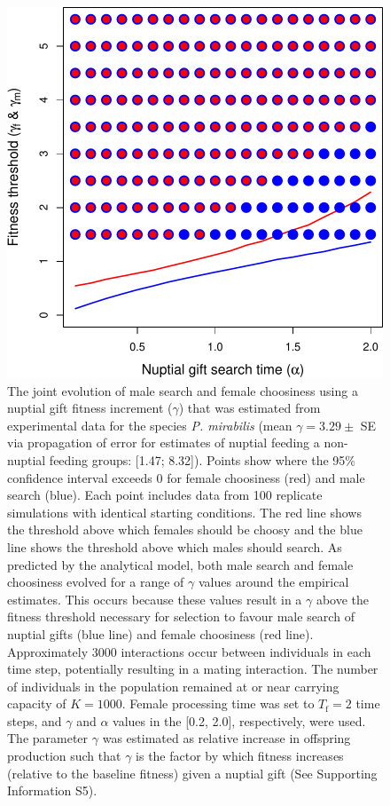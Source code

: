 \documentclass[
]{article}
\begin{document}
\begin{figure}
\centering
\includegraphics{ms_refs_fixed_files/figure-latex/unnamed-chunk-5-1.pdf}
\caption{The joint evolution of male search and female choosiness using
a nuptial gift fitness increment (\(\gamma\)) that was estimated from
experimental data for the species \emph{P. mirabilis} (mean
\(\gamma = 3.29 \pm\) SE via propagation of error for estimates of
nuptial feeding a non-nuptial feeding groups: {[}1.47; 8.32{]}). Points
show where the 95\% confidence interval exceeds 0 for female choosiness
(red) and male search (blue). Each point includes data from 100
replicate simulations with identical starting conditions. The red line
shows the threshold above which females should be choosy and the blue
line shows the threshold above which males should search. As predicted
by the analytical model, both male search and female choosiness evolved
for a range of \(\gamma\) values around the empirical estimates. This
occurs because these values result in a \(\gamma\) above the fitness
threshold necessary for selection to favour male search of nuptial gifts
(blue line) and female choosiness (red line). Approximately 3000
interactions occur between individuals in each time step, potentially
resulting in a mating interaction. The number of individuals in the
population remained at or near carrying capacity of \(K = 1000\). Female
processing time was set to \(T_{\mathrm{f}}=2\) time steps, and
\(\gamma\) and \(\alpha\) values in the {[}0.2, 2.0{]}, respectively,
were used. The parameter \(\gamma\) was estimated as relative increase
in offspring production such that \(\gamma\) is the factor by which
fitness increases (relative to the baseline fitness) given a nuptial
gift (See Supporting Information S5).}
\end{figure}
\end{document}
